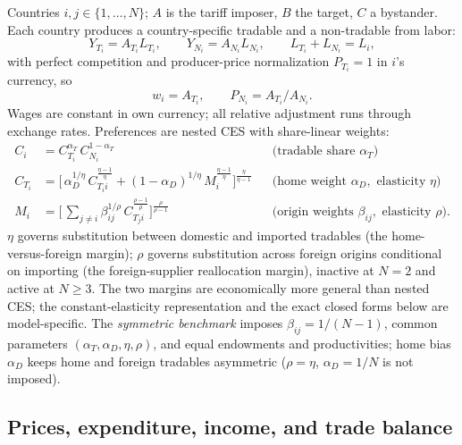 \documentclass[11pt]{article}
\begin{document}
Countries $i, j \in \{1, \dots, N\}$; $A$ is the tariff imposer, $B$ the target, $C$ a bystander. Each country produces a country-specific tradable and a non-tradable from labor:
\begin{equation}
Y_{T_i} = A_{T_i} L_{T_i}, \qquad Y_{N_i} = A_{N_i} L_{N_i}, \qquad L_{T_i} + L_{N_i} = L_i ,
\end{equation}
with perfect competition and producer-price normalization $P_{T_i} = 1$ in $i$'s currency, so
\begin{equation}
w_i = A_{T_i}, \qquad P_{N_i} = A_{T_i}/A_{N_i} .
\label{eq:wage}
\end{equation}
Wages are constant in own currency; all relative adjustment runs through exchange rates. Preferences are nested CES with share-linear weights:
\begin{align}
C_i &= C_{T_i}^{\alpha_T}\, C_{N_i}^{1-\alpha_T}
&& \text{(tradable share } \alpha_T)
\label{eq:outer}\\[2pt]
C_{T_i} &= \Big[\, \alpha_D^{1/\eta}\, C_{T_i i}^{\frac{\eta-1}{\eta}}
+ (1-\alpha_D)^{1/\eta}\, M_i^{\frac{\eta-1}{\eta}} \Big]^{\frac{\eta}{\eta-1}}
&& \text{(home weight } \alpha_D, \text{ elasticity } \eta)
\label{eq:mid}\\[2pt]
M_i &= \Big[\, \textstyle\sum_{j \neq i} \beta_{ij}^{1/\rho}\, C_{T_j i}^{\frac{\rho-1}{\rho}} \Big]^{\frac{\rho}{\rho-1}}
&& \text{(origin weights } \beta_{ij}, \text{ elasticity } \rho) .
\label{eq:inner}
\end{align}
$\eta$ governs substitution between domestic and imported tradables (the home-versus-foreign margin); $\rho$ governs substitution across foreign origins conditional on importing (the foreign-supplier reallocation margin), inactive at $N = 2$ and active at $N \geq 3$. The two margins are economically more general than nested CES; the constant-elasticity representation and the exact closed forms below are model-specific. The \emph{symmetric benchmark} imposes $\beta_{ij} = 1/(N-1)$, common parameters $(\alpha_T, \alpha_D, \eta, \rho)$, and equal endowments and productivities; home bias $\alpha_D$ keeps home and foreign tradables asymmetric ($\rho = \eta$, $\alpha_D = 1/N$ is not imposed).

\subsection{Prices, expenditure, income, and trade balance}
\end{document}
